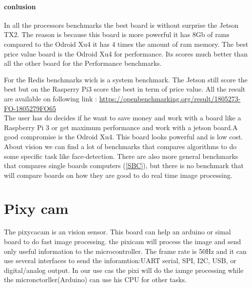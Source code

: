 \documentclass[english]{book_template} %
\begin{document}
\subsubsection{conlusion}

In all the processors benchmarks the best board is without surprise the Jetson TX2. The reason is because this board is more powerful it has 8Gb of rams compared to the Odroid Xu4 it has 4 times the amount of ram memory. 
The best price value board is the Odroid Xu4 for performance. Its scores much better than all the other board for the Performance benchmarks.

For the Redis benchmarks wich is a system benchmark. The Jetson still score the best but on the Rasperry Pi3 score the best in term of price value. 
All the result are available on following link : \url{https://openbenchmarking.org/result/1805273-FO-1805279FO65}\\


%


The user has do decides if he want to save money and work with a board like a  Raspberry Pi 3 or get maximum performance and work with a jetson board.A good compromise is the Odroid Xu4. This board looks powerful and is low cost. \\


About vision we can find a lot of benchmarks that compares algorithms to do some specific task like face-detection. There are also more general benchmarks that compares single boards computers (\ref{SBC}), but there is no benchmark that will compare boards on how they are good to do real time image processing.

\chapter{Pixy cam}

The pixycacam is an vision sensor. This board can help an arduino or simal board to do fast image processing. the pixicam will process the image and send only useful information to the microcontroller. The frame rate is 50Hz and it can use several interfaces to send the inforamtion:UART serial, SPI, I2C, USB, or digital/analog output. In our use cas the pixi will do the iamge processing while the micronctorller(Arduino) can use his CPU for other tasks.\cite{pixy}
\end{document}
